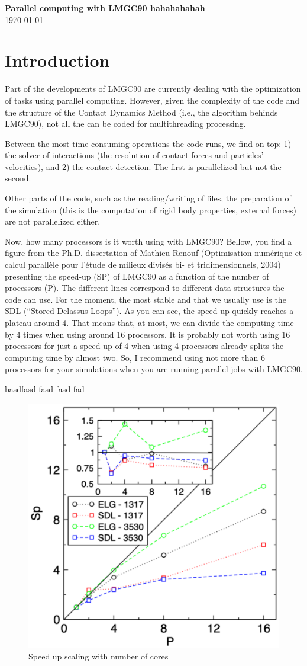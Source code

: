 \documentclass[12pt]{article}
\begin{document}
\thispagestyle{mypagestyle}

\begin{center}
  \textbf{\Large Parallel computing with LMGC90 hahahahahah}\\
  \today
\end{center}

\section*{Introduction}
Part of the developments of LMGC90 are currently dealing with the optimization of tasks using parallel computing. However, given the complexity of the code and the structure of the Contact Dynamics Method (i.e., the algorithm behinds LMGC90), not all the can be coded for multithreading processing.

Between the most time-consuming operations the code runs, we find on top: 1) the solver of interactions (the resolution of contact forces and particles’ velocities), and 2) the contact detection. The first is parallelized but not the second.

Other parts of the code, such as the reading/writing of files, the preparation of the simulation (this is the computation of rigid body properties, external forces) are not parallelized either. 

Now, how many processors is it worth using with LMGC90? Bellow, you find a figure from the Ph.D. dissertation of Mathieu Renouf (Optimisation numérique et calcul parallèle pour l’étude de milieux divisés bi- et tridimensionnels, 2004) presenting the speed-up (SP) of LMGC90 as a function of the number of processors (P). 
The different lines correspond to different data structures the code can use. For the moment, the most stable and that we usually use is the SDL (“Stored Delassus Loops”). 
As you can see, the speed-up quickly reaches a plateau around 4. 
That means that, at most, we can divide the computing time by 4 times when using around 16 processors. It is probably not worth using 16 processors for just a speed-up of 4 when using 4 processors already splits the computing time by almost two. 
So, I recommend using not more than 6 processors for your simulations when you are running parallel jobs with LMGC90. 

basdfasd fasd fasd fad 

\begin{figure}
  \centering
  \includegraphics[width=0.5\linewidth]{figs/1_Scaling.pdf}
  \caption{Speed up scaling with number of cores}
\end{figure}
\end{document}
